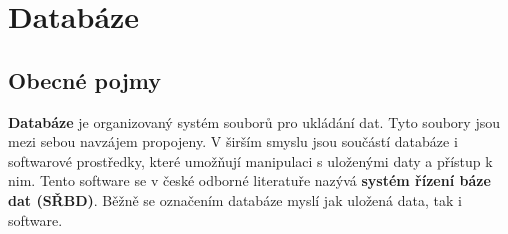 \section{Databáze}

\subsection*{Obecné pojmy}

\textbf{Databáze} je organizovaný systém souborů pro ukládání dat. Tyto soubory jsou mezi sebou navzájem
propojeny. V širším smyslu jsou součástí databáze i softwarové prostředky, které umožňují manipulaci
s uloženými daty a přístup k nim. Tento software se v české odborné literatuře nazývá \textbf{systém řízení
báze dat (SŘBD)}. Běžně se označením databáze myslí jak uložená data, tak i software.

